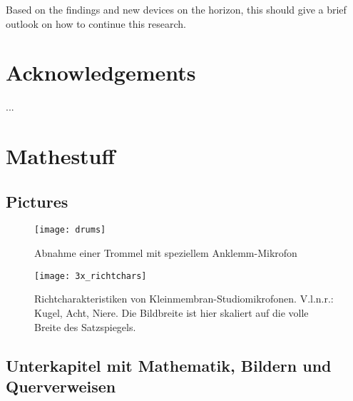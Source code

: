             Based on the findings and new devices on the horizon, this should give a brief outlook on how to continue this research.

    \chapter{Acknowledgements}

        ...




    \chapter{Mathestuff}

        \section{Pictures}

            \begin{figure}[htp]     %
                \centering
                \texttt{[image: drums]} 
                \caption{Abnahme einer Trommel mit speziellem Anklemm-Mikrofon}\label{trommelmik}
                \end{figure}
    
            \begin{figure}[htp]     %
                \centering
                \texttt{[image: 3x\_richtchars]}
                \caption[Richtcharakteristiken von Kleinmembran-Studiomikrofonen]{Richtcharakteristiken von Kleinmembran-Studiomikrofonen. V.l.n.r.: Kugel, Acht, Niere. Die Bildbreite ist hier skaliert auf die volle Breite des Satzspiegels.}\label{richtch}
                \end{figure}

        \section{Unterkapitel mit Mathematik, Bildern und Querverweisen}

